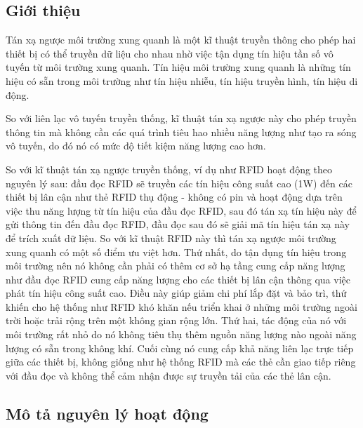 \documentclass{uetgraduation}
\begin{document}
\subsection{Giới thiệu}
Tán xạ ngược môi trường xung quanh là một kĩ thuật truyền thông cho phép hai thiết bị có thể truyền dữ liệu cho nhau nhờ việc tận dụng tín hiệu tần số vô tuyến từ môi trường 
xung quanh. Tín hiệu môi trường xung quanh là những tín hiệu có sẵn trong môi trường như tín hiệu nhiễu, tín hiệu truyền hình, tín hiệu di động.

So với liên lạc vô tuyến truyền thống, kĩ thuật tán xạ ngược này cho phép truyền thông tin mà không cần các quá trình tiêu hao nhiều năng lượng như tạo ra sóng vô tuyến, 
do đó nó có mức độ tiết kiệm năng lượng cao hơn. 

So với kĩ thuật tán xạ ngược truyền thống, ví dụ như RFID hoạt động theo nguyên lý sau: đầu đọc RFID sẽ truyền các tín hiệu công suất cao (1W) đến 
các thiết bị lân cận như thẻ RFID thụ động - không có pin và hoạt động dựa trên việc thu năng lượng từ tín hiệu của đầu đọc RFID, sau đó tán xạ tín hiệu này để gửi thông tin
đến đầu đọc RFID, đầu đọc sau đó sẽ giải mã tín hiệu tán xạ này để trích xuất dữ liệu. So với kĩ thuật RFID này thì tán xạ ngược môi trường xung quanh có một số điểm ưu việt hơn.
Thứ nhất, do tận dụng tín hiệu trong môi trường nên nó không cần phải có thêm cơ sở hạ tầng cung cấp năng lượng như đầu đọc RFID cung cấp năng lượng cho các thiết bị lân cận 
thông qua việc phát tín hiệu công suất cao. Điều này giúp giảm chi phí lắp đặt và bảo trì, thứ khiến cho hệ thống như RFID khó khăn nếu triển khai ở những môi trường ngoài trời
hoặc trải rộng trên một không gian rộng lớn. Thứ hai, tác động của nó với môi trường rất nhỏ do nó không tiêu thụ thêm nguồn năng lượng nào ngoài năng lượng có sẵn trong không
khí. Cuối cùng nó cung cấp khả năng liên lạc trực tiếp giữa các thiết bị, không giống như hệ thống RFID mà các thẻ cần giao tiếp riêng với đầu đọc và không thể cảm nhận được sự
truyền tải của các thẻ lân cận.

\subsection{Mô tả nguyên lý hoạt động}
\end{document}
